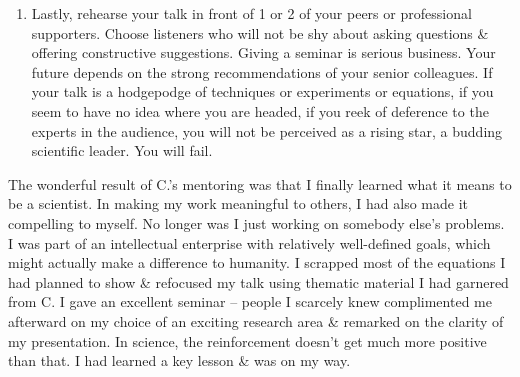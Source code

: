 \documentclass{article}
\begin{document}
\begin{enumerate}
\begin{itemize}
\begin{itemize}
\begin{enumerate}
				\item Lastly, rehearse your talk in front of 1 or 2 of your peers or professional supporters. Choose listeners who will not be shy about asking questions \& offering constructive suggestions. Giving a seminar is serious business. Your future depends on the strong recommendations of your senior colleagues. If your talk is a hodgepodge of techniques or experiments or equations, if you seem to have no idea where you are headed, if you reek of deference to the experts in the audience, you will not be perceived as a rising star, a budding scientific leader. You will fail.
			\end{enumerate}
			The wonderful result of C.'s mentoring was that I finally learned what it means to be a scientist. In making my work meaningful to others, I had also made it compelling to myself. No longer was I just working on somebody else's problems. I was part of an intellectual enterprise with relatively well-defined goals, which might actually make a difference to humanity. I scrapped most of the equations I had planned to show \& refocused my talk using thematic material I had garnered from C. I gave an excellent seminar -- people I scarcely knew complimented me afterward on my choice of an exciting research area \& remarked on the clarity of my presentation. In science, the reinforcement doesn't get much more positive than that. I had learned a key lesson \& was on my way.
			

\end{itemize}
\end{itemize}
\end{enumerate}
\end{document}
